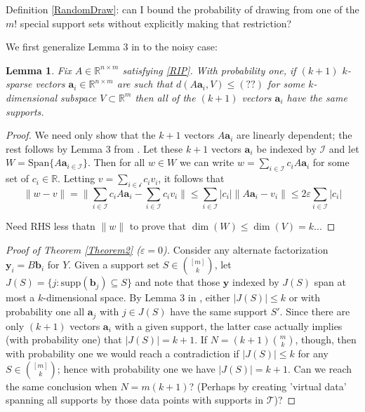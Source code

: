 \documentclass[journal, onecolumn]{IEEEtran}
\newtheorem{lemma}{Lemma}
\begin{document}
Definition \ref{RandomDraw}: can I bound the probability of drawing from one of the $m!$ special support sets without explicitly making that restriction?

We first generalize Lemma 3 in \cite{HS11} to the noisy case:

\begin{lemma}
Fix $A \in \mathbb{R}^{n \times m}$ satisfying \eqref{RIP}. With probability one, if $(k+1)$ $k$-sparse vectors $\mathbf{a}_i \in \mathbb{R}^{n \times m}$ are such that $d(A\mathbf{a}_i,V) \leq (??)$ for some $k$-dimensional subspace $V \subset \mathbb{R}^m$ then all of the $(k+1)$ vectors $\mathbf{a}_i$ have the same supports.
\end{lemma}
\begin{proof}
We need only show that the $k+1$ vectors $A\mathbf{a}_i$ are linearly dependent; the rest follows by Lemma 3 from \cite{HS11}. Let these $k+1$ vectors $\mathbf{a}_i$ be indexed by $\mathcal{I}$ and let $W = \text{Span}\{A\mathbf{a}_{i \in \mathcal{I}}\}$. Then for all $w \in W$ we can write $w = \sum_{i \in \mathcal{I}} c_iA\mathbf{a}_i$ for some set of $c_i \in \mathbb{R}$. Letting $v = \sum_{i \in \mathcal{i}} c_iv_i$, it follows that
\[ \|w - v\| = \|\sum_{i \in \mathcal{I}} c_i A\mathbf{a}_i - \sum_{i \in \mathcal{I}} c_i v_i \| 
\leq \sum_{i \in \mathcal{I}} |c_i| \|A\mathbf{a}_i - v_i\| \leq 2\varepsilon \sum_{i \in \mathcal{I}}|c_i| \]

Need RHS less thatn $\|w\|$ to prove that $\dim(W) \leq \dim(V) = k$...
\end{proof}

\begin{proof}[Proof of Theorem \ref{Theorem2} ($\varepsilon = 0$)]
Consider any alternate factorization $\mathbf{y}_i = B\mathbf{b}_i$ for $Y$. Given a support set $S \in {[m]\choose k}$, let $J(S) = \{j: \text{supp}(\mathbf{b}_j) \subseteq S\}$ and note that those $\mathbf{y}$ indexed by $J(S)$ span at most a $k$-dimensional space. By Lemma 3 in \cite{HS11}, either $|J(S)| \leq k$ or with probability one all $\mathbf{a}_j$ with $j \in J(S)$ have the same support $S'$. Since there are only $(k+1)$ vectors $\mathbf{a}_i$ with a given support, the latter case actually implies (with probability one) that $|J(S)| = k+1$. If $N=(k+1){m \choose k}$, though, then with probability one we would reach a contradiction if $|J(S)| \leq k$ for any $S \in {[m] \choose k}$; hence with probability one we have $|J(S)| = k+1$. Can we reach the same conclusion when $N = m(k+1)$? (Perhaps by creating 'virtual data' spanning all supports by those data points with supports in $\mathcal{T}$)?

\end{proof}
\end{document}
